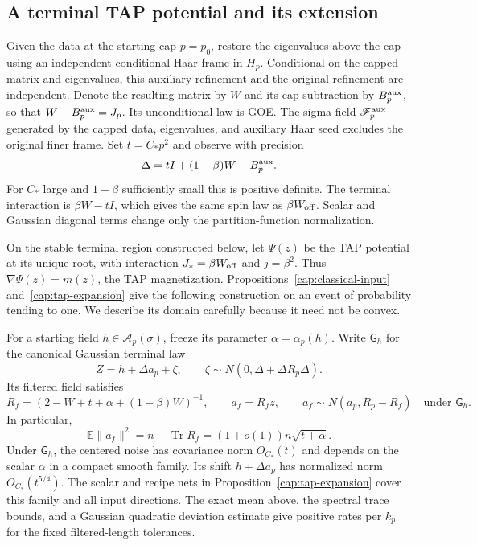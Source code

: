 \subsection{A terminal TAP potential and its extension}

Given the data at the starting cap $p=p_0$, restore the eigenvalues above the
cap using an independent conditional Haar frame in $H_p$. Conditional on
the capped matrix and eigenvalues, this auxiliary refinement and the
original refinement are independent. Denote the resulting matrix by $W$
and its cap subtraction by $B_p^{\rm aux}$, so that $W-B_p^{\rm aux}=J_p$.
Its unconditional law is GOE. The sigma-field
$\mathscr F_p^{\rm aux}$ generated by the capped data, eigenvalues, and
auxiliary Haar seed excludes the original finer frame. Set $t=C_*p^2$ and observe with
precision
\begin{equation}\label{cap:initial-precision}
 \Delta=tI+(1-\beta)W-B_p^{\rm aux}.
\end{equation}
For $C_*$ large and $1-\beta$ sufficiently small this is positive definite.
The terminal interaction is $\beta W-tI$, which gives the same spin law as
$\beta W_{\rm off}$. Scalar and Gaussian diagonal terms change only the
partition-function normalization.

On the stable terminal region constructed below, let $\Psi(z)$ be the TAP
potential at its unique root, with interaction $J_*=\beta W_{\rm off}$ and
$j=\beta^2$. Thus $\nabla\Psi(z)=m(z)$, the TAP magnetization.
Propositions~\ref{cap:classical-input} and~\ref{cap:tap-expansion} give the
following construction on an event of probability tending to one. We describe
its domain carefully because it need not be convex.

For a starting field $h\in\mathcal A_p(\sigma)$, freeze its parameter
$\alpha=\alpha_p(h)$. Write $\mathsf G_h$ for the canonical Gaussian
terminal law
\[
 Z=h+\Delta a_p+\zeta,\qquad
 \zeta\sim N(0,\Delta+\Delta R_p\Delta).
\]
Its filtered field satisfies
\begin{equation}\label{cap:initial-frozen}
 R_f=(2-W+t+\alpha+(1-\beta)W)^{-1},\qquad a_f=R_fz,
 \qquad
 a_f\sim N(a_p,R_p-R_f)\quad\text{under }\mathsf G_h.
\end{equation}
In particular,
\[
 \mathbb E\|a_f\|^2=n-\operatorname{Tr}R_f
       =(1+o(1))n\sqrt{t+\alpha}.
\]
Under $\mathsf G_h$, the centered noise has covariance norm $O_{C_*}(t)$
and depends on the scalar $\alpha$ in a compact smooth family. Its shift
$h+\Delta a_p$ has normalized norm $O_{C_*}(t^{5/4})$. The scalar and
recipe nets in Proposition~\ref{cap:tap-expansion} cover this family and
all input directions. The exact mean above, the spectral trace bounds,
and a Gaussian quadratic deviation estimate give positive rates per $k_p$
for the fixed filtered-length tolerances.

